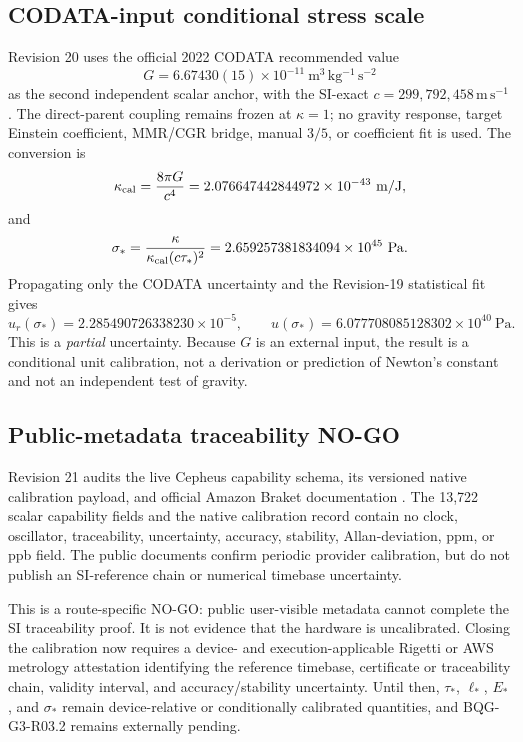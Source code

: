 \documentclass[11pt]{article}
\theoremstyle{definition}
\theoremstyle{remark}
\begin{document}
\subsection{CODATA-input conditional stress scale}

Revision 20 uses the official 2022 CODATA recommended value
\begin{equation}
 G=6.67430(15)\times10^{-11}\ \mathrm{m^3\,kg^{-1}\,s^{-2}}
\end{equation}
as the second independent scalar anchor, with the SI-exact $c=299,792,458\,\mathrm{m\,s^{-1}}$ \cite{codata2022,bipmSI}. The direct-parent coupling remains frozen at $\kappa=1$; no gravity response, target Einstein coefficient, MMR/CGR bridge, manual $3/5$, or coefficient fit is used. The conversion is
\begin{equation}
 \kappa_{\rm cal}=\frac{8\pi G}{c^4}
 =2.076647442844972\times10^{-43}\ \mathrm{m/J},
\end{equation}
and
\begin{equation}
 \sigma_*=\frac{\kappa}{\kappa_{\rm cal}(c\tau_*)^2}
 =2.659257381834094\times10^{45}\ \mathrm{Pa}.
\end{equation}
Propagating only the CODATA uncertainty and the Revision-19 statistical fit gives
\begin{equation}
 u_r(\sigma_*)=2.285490726338230\times10^{-5},
 \qquad
 u(\sigma_*)=6.077708085128302\times10^{40}\ \mathrm{Pa}.
\end{equation}
This is a \emph{partial} uncertainty. Because $G$ is an external input, the result is a conditional unit calibration, not a derivation or prediction of Newton's constant and not an independent test of gravity.

\subsection{Public-metadata traceability NO-GO}

Revision 21 audits the live Cepheus capability schema, its versioned native calibration payload, and official Amazon Braket documentation \cite{awsPulse,awsNativePulse}. The 13,722 scalar capability fields and the native calibration record contain no clock, oscillator, traceability, uncertainty, accuracy, stability, Allan-deviation, ppm, or ppb field. The public documents confirm periodic provider calibration, but do not publish an SI-reference chain or numerical timebase uncertainty.

This is a route-specific NO-GO: public user-visible metadata cannot complete the SI traceability proof. It is not evidence that the hardware is uncalibrated. Closing the calibration now requires a device- and execution-applicable Rigetti or AWS metrology attestation identifying the reference timebase, certificate or traceability chain, validity interval, and accuracy/stability uncertainty. Until then, $\tau_*$, $\ell_*$, $E_*$, and $\sigma_*$ remain device-relative or conditionally calibrated quantities, and BQG-G3-R03.2 remains externally pending.
\end{document}

